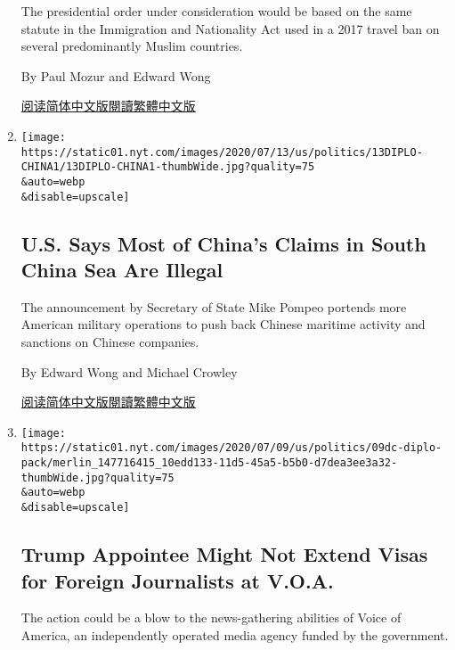 \begin{enumerate}
  The presidential order under consideration would be based on the same
  statute in the Immigration and Nationality Act used in a 2017 travel
  ban on several predominantly Muslim countries.

  By Paul Mozur and Edward Wong

  \href{https://cn.nytimes.com/usa/20200716/china-travel-ban/}{阅读简体中文版}\href{https://cn.nytimes.com/usa/20200716/china-travel-ban/zh-hant/}{閱讀繁體中文版}
\item
  \href{/2020/07/13/world/asia/south-china-sea-pompeo.html}{}

  \texttt{[image: https://static01.nyt.com/images/2020/07/13/us/politics/13DIPLO-CHINA1/13DIPLO-CHINA1-thumbWide.jpg?quality=75\\\&auto=webp\\\&disable=upscale]}

  \hypertarget{us-says-most-of-chinas-claims-in-south-china-sea-are-illegal}{%
  \subsection{U.S. Says Most of China's Claims in South China Sea Are
  Illegal}\label{us-says-most-of-chinas-claims-in-south-china-sea-are-illegal}}

  The announcement by Secretary of State Mike Pompeo portends more
  American military operations to push back Chinese maritime activity
  and sanctions on Chinese companies.

  By Edward Wong and Michael Crowley

  \href{https://cn.nytimes.com/asia-pacific/20200714/south-china-sea-pompeo/}{阅读简体中文版}\href{https://cn.nytimes.com/asia-pacific/20200714/south-china-sea-pompeo/zh-hant/}{閱讀繁體中文版}
\item
  \href{/2020/07/09/us/politics/voice-of-america-visas-michael-pack.html}{}

  \texttt{[image: https://static01.nyt.com/images/2020/07/09/us/politics/09dc-diplo-pack/merlin\_147716415\_10edd133-11d5-45a5-b5b0-d7dea3ee3a32-thumbWide.jpg?quality=75\\\&auto=webp\\\&disable=upscale]}

  \hypertarget{trump-appointee-might-not-extend-visas-for-foreign-journalists-at-voa}{%
  \subsection{Trump Appointee Might Not Extend Visas for Foreign
  Journalists at
  V.O.A.}\label{trump-appointee-might-not-extend-visas-for-foreign-journalists-at-voa}}

  The action could be a blow to the news-gathering abilities of Voice of
  America, an independently operated media agency funded by the
  government.


\end{enumerate}
